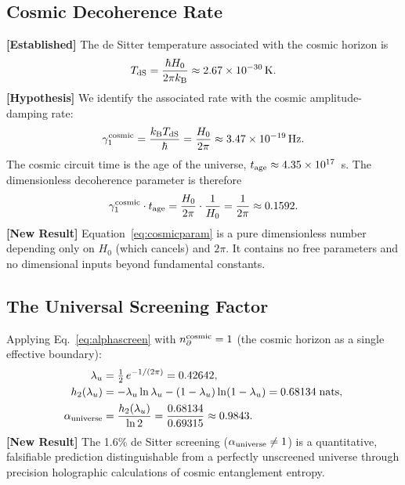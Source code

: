 \documentclass[12pt,letterpaper]{article}
\theoremstyle{definition}
\theoremstyle{remark}
\newcommand{\established}{\textbf{[Established]}}
\newcommand{\hypothesis}{\textbf{[Hypothesis]}}
\newcommand{\newresult}{\textbf{[New Result]}}
\newcommand{\gammaone}{\gamma_{1}}
\newcommand{\hb}{\hbar}
\newcommand{\kB}{k_{\rm B}}
\begin{document}
\subsection{Cosmic Decoherence Rate}

\established{} The de Sitter temperature associated with the cosmic horizon
is~\cite{planck2020}
\begin{equation}
T_{\rm dS} = \frac{\hb H_0}{2\pi\kB} \approx 2.67\times 10^{-30}\,\text{K}.
\end{equation}
\hypothesis{} We identify the associated rate with the cosmic amplitude-damping rate:
\begin{equation}
\gammaone^{\rm cosmic} = \frac{\kB T_{\rm dS}}{\hb} = \frac{H_0}{2\pi}
  \approx 3.47\times 10^{-19}\,\text{Hz}.
\end{equation}
The cosmic circuit time is the age of the universe, $t_{\rm age}\approx 4.35\times 10^{17}$~s.
The dimensionless decoherence parameter is therefore
\begin{equation}
\gammaone^{\rm cosmic}\cdot t_{\rm age}
  = \frac{H_0}{2\pi}\cdot\frac{1}{H_0} = \frac{1}{2\pi} \approx 0.1592.
\label{eq:cosmicparam}
\end{equation}
\newresult{} Equation~\eqref{eq:cosmicparam} is a pure dimensionless number depending
only on $H_0$ (which cancels) and $2\pi$.
It contains no free parameters and no dimensional inputs beyond fundamental constants.

\subsection{The Universal Screening Factor}

Applying Eq.~\eqref{eq:alphascreen} with $n_\partial^{\rm cosmic} = 1$ (the cosmic
horizon as a single effective boundary):
\begin{align}
\lambda_u &= \tfrac{1}{2}\,e^{-1/(2\pi)} = 0.42642, \\
h_2(\lambda_u) &= -\lambda_u\ln\lambda_u - (1-\lambda_u)\ln(1-\lambda_u)
  = 0.68134\;\text{nats}, \\
\alpha_{\rm universe} &= \frac{h_2(\lambda_u)}{\ln 2}
  = \frac{0.68134}{0.69315} \approx 0.9843.
\label{eq:alphaUniv}
\end{align}
\newresult{} The 1.6\% de Sitter screening ($\alpha_{\rm universe}\ne 1$) is a
quantitative, falsifiable prediction distinguishable from a perfectly unscreened
universe through precision holographic calculations of cosmic entanglement entropy.
\end{document}
